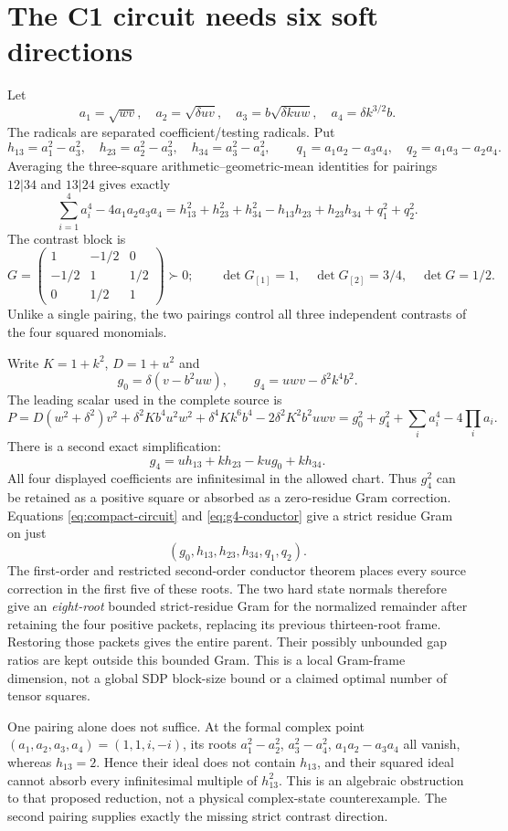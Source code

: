 \section{The C1 circuit needs six soft directions}
Let
\[
a_1=\sqrt{wv},\quad a_2=\sqrt{\delta uv},\quad
a_3=b\sqrt{\delta kuw},\quad a_4=\delta k^{3/2}b.
\]
The radicals are separated coefficient/testing radicals. Put
\[
h_{13}=a_1^2-a_3^2,\quad h_{23}=a_2^2-a_3^2,\quad
h_{34}=a_3^2-a_4^2,
\qquad q_1=a_1a_2-a_3a_4,\quad q_2=a_1a_3-a_2a_4.
\]
Averaging the three-square arithmetic--geometric-mean identities for
pairings $12|34$ and $13|24$ gives exactly
\begin{equation}
\sum_{i=1}^4a_i^4-4a_1a_2a_3a_4
=h_{13}^2+h_{23}^2+h_{34}^2-h_{13}h_{23}+h_{23}h_{34}
 +q_1^2+q_2^2.\label{eq:compact-circuit}
\end{equation}
The contrast block is
\[
G=\begin{pmatrix}1&-1/2&0\\-1/2&1&1/2\\0&1/2&1\end{pmatrix}\succ0;
\qquad \det G_{[1]}=1,\quad\det G_{[2]}=3/4,\quad\det G=1/2.
\]
Unlike a single pairing, the two pairings control all three independent
contrasts of the four squared monomials.

Write $K=1+k^2$, $D=1+u^2$ and
\[
g_0=\delta(v-b^2uw),\qquad g_4=uwv-\delta^2k^4b^2.
\]
The leading scalar used in the complete source is
\[
P=D(w^2+\delta^2)v^2+\delta^2Kb^4u^2w^2+
\delta^4Kk^6b^4-2\delta^2K^2b^2uwv
=g_0^2+g_4^2+\sum_i a_i^4-4\prod_i a_i.
\]
There is a second exact simplification:
\begin{equation}
g_4=u h_{13}+k h_{23}-ku g_0+k h_{34}.\label{eq:g4-conductor}
\end{equation}
All four displayed coefficients are infinitesimal in the allowed chart.
Thus $g_4^2$ can be retained as a positive square or absorbed as a
zero-residue Gram correction. Equations \eqref{eq:compact-circuit} and
\eqref{eq:g4-conductor} give a strict residue Gram on just
\[
\boxed{(g_0,h_{13},h_{23},h_{34},q_1,q_2).}
\]
The first-order and restricted second-order conductor theorem places
every source correction in the first five of these roots. The two hard
state normals therefore give an \emph{eight-root} bounded strict-residue
Gram for the normalized remainder after retaining the four positive
packets, replacing its previous thirteen-root frame. Restoring those
packets gives the entire parent. Their possibly unbounded gap ratios
are kept outside this bounded Gram. This is a local Gram-frame
dimension, not a global SDP block-size bound or a claimed optimal number
of tensor squares.

One pairing alone does not suffice. At the formal complex point
$(a_1,a_2,a_3,a_4)=(1,1,i,-i)$, its roots
$a_1^2-a_2^2$, $a_3^2-a_4^2$, $a_1a_2-a_3a_4$ all vanish, whereas
$h_{13}=2$. Hence their ideal does not contain $h_{13}$, and their squared
ideal cannot absorb every infinitesimal multiple of $h_{13}^2$.
This is an algebraic obstruction to that proposed reduction, not a physical
complex-state counterexample. The second pairing supplies exactly the
missing strict contrast direction.
